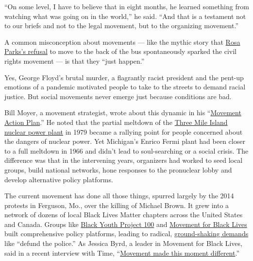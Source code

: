 ``On some level, I have to believe that in eight months, he learned
something from watching what was going on in the world,'' he said. ``And
that is a testament not to our briefs and not to the legal movement, but
to the organizing movement.''

A common misconception about movements --- like the mythic story that
\href{https://genprogress.org/the-myth-of-rosa-parks/}{Rosa Parks's
refusal} to move to the back of the bus spontaneously sparked the civil
rights movement --- is that they ``just happen.''

Yes, George Floyd's brutal murder, a flagrantly racist president and the
pent-up emotions of a pandemic motivated people to take to the streets
to demand racial justice. But social movements never emerge just because
conditions are bad.

Bill Moyer, a movement strategist, wrote about this dynamic in his
``\href{https://www.indybay.org/olduploads/movement_action_plan.pdf}{Movement
Action Plan}.'' He noted that the partial meltdown of the
\href{https://www.nytimes.com/1979/04/16/archives/three-mile-island-notes-from-a-nightmare-three-mile-island-a.html}{Three
Mile Island nuclear power plant} in 1979 became a rallying point for
people concerned about the dangers of nuclear power. Yet Michigan's
Enrico Fermi plant had been closer to a full meltdown in 1966 and didn't
lead to soul-searching or a social crisis. The difference was that in
the intervening years, organizers had worked to seed local groups, build
national networks, hone responses to the pronuclear lobby and develop
alternative policy platforms.

The current movement has done all those things, spurred largely by the
2014 protests in Ferguson, Mo., over the killing of Michael Brown. It
grew into a network of dozens of local Black Lives Matter chapters
across the United States and Canada. Groups like
\href{http://agendatobuildblackfutures.org/wp-content/uploads/2016/01/BYP_AgendaBlackFutures_booklet_web.pdf}{Black
Youth Project 100} and
\href{https://m4bl.org/policy-platforms/}{Movement for Black Lives}
built comprehensive policy platforms, leading to radical,
\href{https://mavenroundtable.io/rinkusen/politics/why-defundthepolice-is-genius-strategy-ZNTk0AGz3kOxAwIqj2BTEg}{ground-shaking
demands} like ``defund the police.'' As Jessica Byrd, a leader in
Movement for Black Lives, said in a recent interview with Time,
``\href{https://time.com/5847506/time-100-talks-black-lives-matter/}{Movement
made this moment different}.''

